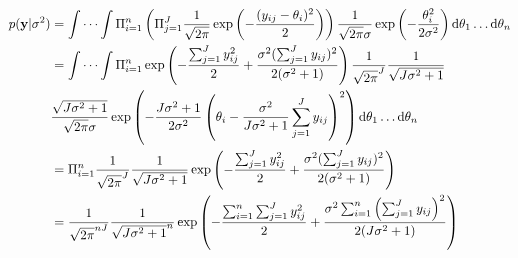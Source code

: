 \documentclass{article}
\begin{document}
	\subsection{}
		\begin{align*}
		p({\bf y} | \sigma^2) &= \idotsint \Pi_{i = 1}^{n} \left(\Pi_{j=1}^{J} \frac{1}{\sqrt{2\pi}} \exp\left( -\frac{(y_{ij} - \theta_i)^2}{2}\right) \right)\frac{1}{\sqrt{2\pi}\sigma} \exp\left( -\frac{\theta_i^2}{2\sigma^2}\right)\mathrm{d}\theta_1 \dots \mathrm{d}\theta_n \\
		&= \idotsint \Pi_{i = 1}^{n} \exp\left( -\frac{\sum_{j=1}^{J} y_{ij}^2}{2} + \frac{\sigma^2 (\sum_{j=1}^{J} y_{ij})^2}{2(\sigma^2 + 1)} \right) \frac{1}{\sqrt{2\pi}^J} \frac{1}{\sqrt{J\sigma^2 + 1}} \\ &\frac{\sqrt{J\sigma^2 + 1}}{\sqrt{2\pi}\sigma} \exp\left(-\frac{J\sigma^2 + 1}{2\sigma^2} \left( \theta_i - \frac{\sigma^2}{J\sigma^2 + 1} \sum_{j=1}^{J} y_{ij} \right)^2\right)\mathrm{d}\theta_1 \dots \mathrm{d}\theta_n \\
		&= \Pi_{i=1}^{n} \frac{1}{\sqrt{2\pi}^J} \frac{1}{\sqrt{J\sigma^2 + 1}} \exp\left( -\frac{\sum_{j=1}^{J} y_{ij}^2}{2} + \frac{\sigma^2 (\sum_{j=1}^{J} y_{ij})^2}{2(\sigma^2 + 1)} \right)\\
		&= \frac{1}{\sqrt{2\pi}^{nJ}} \frac{1}{\sqrt{J\sigma^2 + 1}^{n}} \exp\left( -\frac{\sum_{i=1}^{n} \sum_{j=1}^{J} y_{ij}^2}{2} + \frac{\sigma^2 \sum_{i=1}^{n} \left( \sum_{j=1}^{J} y_{ij}\right)^2}{2(J\sigma^2+ 1)}\right)\\
		\end{align*}
\end{document}
